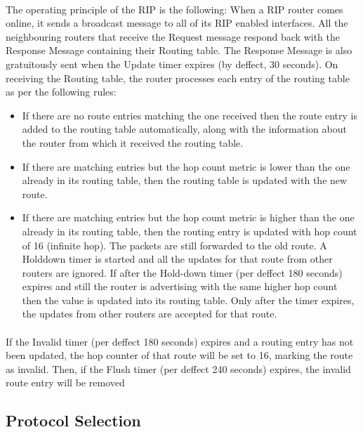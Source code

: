 \paragraph{}The operating principle of the RIP is the following: When a RIP router comes online, it sends a broadcast message to all of its RIP enabled interfaces. All the neighbouring routers that receive the Request message respond back with the Response Message containing their Routing table. The Response Message is also gratuitously sent when the Update timer expires (by deffect, 30 seconds). On receiving the Routing table, the router processes each entry of the routing table as per the following rules:
\begin{itemize}
\item{} If there are no route entries matching the one received then the route entry is added to the routing table automatically, along with the information about the router from which it received the routing table.
\item{} If there are matching entries but the hop count metric is lower than the one already in its routing table, then the routing table is updated with the new route.
\item{} If there are matching entries but the hop count metric is higher than the one already in its routing table, then the routing entry is updated with hop count of 16 (infinite hop). The packets are still forwarded to the old route. A Holddown timer is started and all the updates for that route from other routers are ignored. If after the Hold-down timer (per deffect 180 seconds) expires and still the router is advertising with the same higher hop count then the value is updated into its routing table. Only after the timer expires, the updates from other routers are accepted for that route.
\end{itemize}
\paragraph{}If the Invalid timer (per deffect 180 seconds) expires and a routing entry has not been updated, the hop counter of that route will be set to 16, marking the route as invalid. Then, if the Flush timer (per deffect 240 seconds) expires, the invalid route entry will be removed

\subsection{Protocol Selection}

